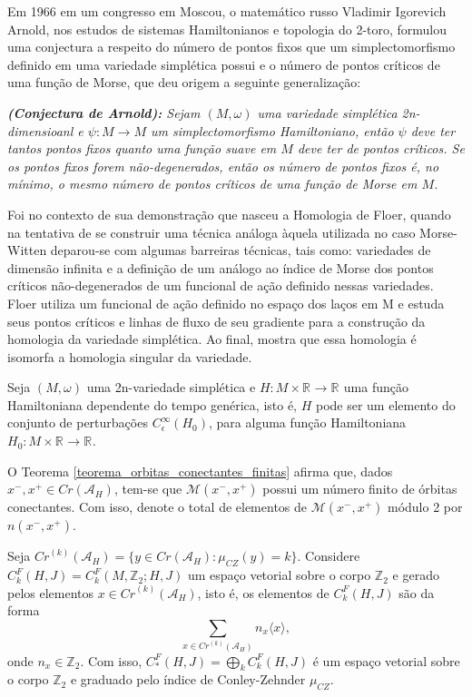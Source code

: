\documentclass[12pt]{book}
\newcommand{\energiafinitaM}{\mathcal{M}}
\newcommand{\energiafinitaMconectante}{\energiafinitaM(x^{-}, x^{+})}
\newcommand{\funcionalH}{\mathcal{A}_{H}}
\newcommand{\gerador}[1]{\langle #1\rangle}
\newcommand{\iconley}[1]{\iconleyabrev(#1)}
\newcommand{\iconleyabrev}{\mu_{CZ}}
\newcommand{\inteiros}{\mathbb{Z}}
\newcommand{\perturbacaoHamiltoniana}[1]{C^{\infty}_{\epsilon}(#1)}
\newcommand{\pontoscriticos}[1]{\textit{Cr}(#1)}
\newcommand{\pontoscriticosordem}[2]{\textit{Cr}^{(#1)}(#2)}
\newcommand{\real}[1]{\mathbb{R}^{#1}}
\newcommand{\reta}{\real{}}
\begin{document}
	Em 1966 em um congresso em Moscou, o matemático russo Vladimir Igorevich Arnold, nos estudos de sistemas Hamiltonianos e topologia do 2-toro, formulou uma conjectura a respeito do número de pontos fixos que um simplectomorfismo definido em uma variedade simplética possui e o número de pontos críticos de uma função de Morse, que deu origem a seguinte generalização:
	
	\textit{\textbf{(Conjectura de Arnold):} Sejam $(M, \omega)$ uma variedade simplética 2n-dimensioanl e $\psi : M \to M $ um simplectomorfismo Hamiltoniano, então $\psi$ deve ter tantos pontos fixos quanto uma função suave em $M$ deve ter de pontos críticos. Se os pontos fixos forem não-degenerados, então os número de pontos fixos é, no mínimo, o mesmo número de pontos críticos de uma função de Morse em $M$.}
	
	Foi no contexto de sua demonstração que nasceu a Homologia de Floer, quando na tentativa de se construir uma técnica análoga àquela utilizada no caso Morse-Witten deparou-se com algumas barreiras técnicas, tais como: variedades de dimensão infinita e a definição de um análogo ao índice de Morse dos pontos críticos não-degenerados de um funcional de ação definido nessas variedades. Floer utiliza um funcional de ação definido no espaço dos laços em M e estuda seus pontos críticos e linhas de fluxo de seu gradiente para a construção da homologia da variedade simplética. Ao final, mostra que essa homologia é isomorfa a homologia singular da variedade.
	
	
	Seja $(M,\omega)$ uma 2n-variedade simplética e $H: M\times \reta\to \reta$ uma função Hamiltoniana dependente do tempo genérica, isto é, $H$ pode ser um elemento do conjunto de perturbações $\perturbacaoHamiltoniana{H_{0}}$, para alguma função Hamiltoniana $H_{0}:M\times \reta \to \reta$.
	
	O Teorema \ref{teorema_orbitas_conectantes_finitas} afirma que, dados $x^{-},x^{+} \in \pontoscriticos{\funcionalH}$, tem-se que $\energiafinitaMconectante$ possui um número finito de órbitas conectantes. Com isso, denote o total de elementos de $\energiafinitaMconectante$ módulo 2 por $n(x^{-},x^{+})$.
	
	 Seja $\pontoscriticosordem{k}{\funcionalH} = \{ y \in \pontoscriticos{\funcionalH}: \iconley{y}=k\}$. Considere $C^{F}_{k}(H,J)=C^{F}_{k}(M, \inteiros_{2}; H,J)$ um espaço vetorial sobre o corpo $\inteiros_{2}$ e gerado pelos elementos $x \in \pontoscriticosordem{k}{\funcionalH} $, isto é, os elementos de $C^{F}_{k}(H,J)$ são da forma
	$$
		\sum_{x\in \pontoscriticosordem{k}{\funcionalH} }n_{x}\gerador{x},
	$$
	onde $n_{x}\in \inteiros_{2}$. Com isso, $C^{F}_{*}(H,J)=\bigoplus_{k}C^{F}_{k}(H,J)$ é um espaço vetorial sobre o corpo $\inteiros_{2}$ e graduado pelo índice de Conley-Zehnder $\iconleyabrev$.
\end{document}
